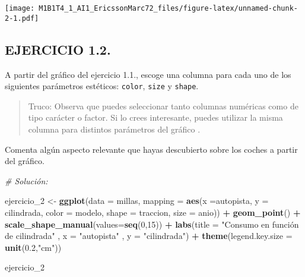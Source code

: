 \documentclass[]{article}
\newenvironment{Shaded}{\begin{snugshade}}{\end{snugshade}}
\newcommand{\CommentTok}[1]{\textcolor[rgb]{0.56,0.35,0.01}{\textit{#1}}}
\newcommand{\DataTypeTok}[1]{\textcolor[rgb]{0.13,0.29,0.53}{#1}}
\newcommand{\DecValTok}[1]{\textcolor[rgb]{0.00,0.00,0.81}{#1}}
\newcommand{\FloatTok}[1]{\textcolor[rgb]{0.00,0.00,0.81}{#1}}
\newcommand{\KeywordTok}[1]{\textcolor[rgb]{0.13,0.29,0.53}{\textbf{#1}}}
\newcommand{\NormalTok}[1]{#1}
\newcommand{\OperatorTok}[1]{\textcolor[rgb]{0.81,0.36,0.00}{\textbf{#1}}}
\newcommand{\StringTok}[1]{\textcolor[rgb]{0.31,0.60,0.02}{#1}}
\begin{document}
\texttt{[image: M1B1T4\_1\_AI1\_EricssonMarc72\_files/figure-latex/unnamed-chunk-2-1.pdf]}

\hypertarget{ejercicio-1.2.}{%
\subsection{EJERCICIO 1.2.}\label{ejercicio-1.2.}}

A partir del gráfico del ejercicio 1.1., escoge una columna para cada
uno de los siguientes parámetros estéticos: \texttt{color},
\texttt{size} y \texttt{shape}.

\begin{quote}
Truco: Observa que puedes seleccionar tanto columnas numéricas como de
tipo carácter o factor. Si lo crees interesante, puedes utilizar la
misma columna para distintos parámetros del gráfico .
\end{quote}

Comenta algún aspecto relevante que hayas descubierto sobre los coches a
partir del gráfico.

\begin{Shaded}
\begin{Highlighting}[]
\CommentTok{# Solución:}

\NormalTok{ejercicio_}\DecValTok{2}\NormalTok{ <-}\StringTok{ }\KeywordTok{ggplot}\NormalTok{(}\DataTypeTok{data =}\NormalTok{ millas, }\DataTypeTok{mapping =} \KeywordTok{aes}\NormalTok{(}\DataTypeTok{x =}\NormalTok{autopista, }\DataTypeTok{y =}\NormalTok{ cilindrada, }\DataTypeTok{color =}\NormalTok{ modelo, }\DataTypeTok{shape =}\NormalTok{ traccion, }\DataTypeTok{size =}\NormalTok{ anio)) }\OperatorTok{+}\StringTok{ }
\StringTok{  }\KeywordTok{geom_point}\NormalTok{() }\OperatorTok{+}
\StringTok{  }\KeywordTok{scale_shape_manual}\NormalTok{(}\DataTypeTok{values=}\KeywordTok{seq}\NormalTok{(}\DecValTok{0}\NormalTok{,}\DecValTok{15}\NormalTok{)) }\OperatorTok{+}
\StringTok{  }\KeywordTok{labs}\NormalTok{(}\DataTypeTok{title =} \StringTok{"Consumo en función de cilindrada"}
\NormalTok{       , }\DataTypeTok{x =} \StringTok{"autopista"}
\NormalTok{       , }\DataTypeTok{y =} \StringTok{"cilindrada"}\NormalTok{) }\OperatorTok{+}
\StringTok{  }\KeywordTok{theme}\NormalTok{(}\DataTypeTok{legend.key.size =} \KeywordTok{unit}\NormalTok{(}\FloatTok{0.2}\NormalTok{,}\StringTok{"cm"}\NormalTok{))}

\NormalTok{ejercicio_}\DecValTok{2}
\end{Highlighting}
\end{Shaded}
\end{document}
